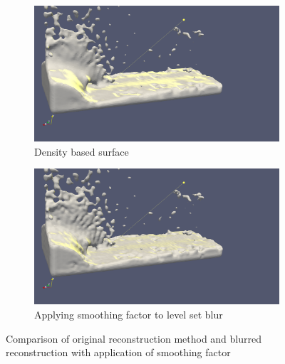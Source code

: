 \begin{figure}[H]
        \begin{subfigure}[b]{0.5\textwidth}
               \includegraphics[width=\textwidth]{figures/DenvityBasedSplashArea2.png}
               \caption{Density based surface}
               \label{fig:db_rec}
        \end{subfigure}
        \begin{subfigure}[b]{0.5\textwidth}
               \includegraphics[width=\textwidth]{figures/DenvityBlurredSplashArea2.png}
               \caption{Applying smoothing factor to level set blur}
				\label{fig:blur_with_sf}
        \end{subfigure}
       \caption{Comparison of original reconstruction method and blurred reconstruction with application of smoothing factor}
       \label{fig:blur_thin_area_with_sf}
 \end{figure}
